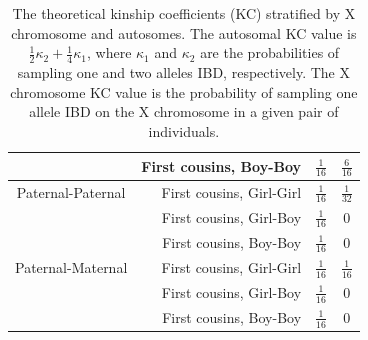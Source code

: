 \documentclass[11pt]{article} %
\begin{document}
\begin{table}[ht]
\begin{tabular}{crcc}
& First cousins, Boy-Boy & $\frac{1}{16}$ & $\frac{6}{16}$\\
\hline
Paternal-Paternal & First cousins, Girl-Girl & $\frac{1}{16}$ & $\frac{1}{32}$\\
& First cousins, Girl-Boy & $\frac{1}{16}$ & 0\\
& First cousins, Boy-Boy & $\frac{1}{16}$ & 0\\
\hline
Paternal-Maternal & First cousins, Girl-Girl & $\frac{1}{16}$ & $\frac{1}{16}$\\
& First cousins, Girl-Boy & $\frac{1}{16}$ & 0\\
& First cousins, Boy-Boy & $\frac{1}{16}$ & 0\\
\hline
\end{tabular}
\caption{The theoretical kinship coefficients (KC) stratified by X chromosome and autosomes. The autosomal KC value is $\frac{1}{2}\kappa_2+\frac{1}{4}\kappa_1$, where $\kappa_1$ and $\kappa_2$ are the probabilities of sampling one and two alleles IBD, respectively. The X chromosome KC value is the probability of sampling one allele IBD on the X chromosome in a given pair of individuals.}
\label{kc_auto_x}
\end{table}
\end{document}
